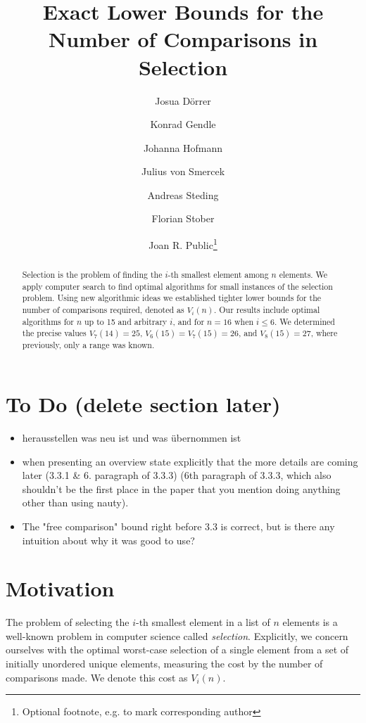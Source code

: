 \documentclass[a4paper,UKenglish,cleveref, autoref, thm-restate]{lipics-v2021}
\title{\Large Exact Lower Bounds for the Number of Comparisons in Selection}
\author{Josua Dörrer}{University Stuttgart}{}{}{}
\author{Konrad Gendle}{University Stuttgart}{}{}{}
\author{Johanna Hofmann}{University Stuttgart}{}{}{}
\author{Julius von Smercek}{University Stuttgart}{}{}{}
\author{Andreas Steding}{University Stuttgart}{}{}{}
\author{Florian Stober}{University Stuttgart}{}{}{}
\author{Joan R. Public\footnote{Optional footnote, e.g. to mark corresponding author}}{Department of Informatics, Dummy College, [optional: Address], Country}{joanrpublic@dummycollege.org}{[orcid]}{[funding]}
\begin{document}
\maketitle

\begin{abstract} \small\baselineskip=9pt
  Selection is the problem of finding the $i$-th smallest element among $n$ elements.
  We apply computer search to find optimal algorithms for small instances of the selection problem.
  Using new algorithmic ideas we established tighter lower bounds for the number of comparisons required, denoted as $V_i(n)$.
  Our results include optimal algorithms for $n$ up to 15 and arbitrary $i$, and for $n=16$ when $i \leq 6$.
  We determined the precise values $V_7(14) = 25$, $V_6(15) = V_7(15) = 26$, and $V_8(15) = 27$, where previously, only a range was known.

\end{abstract} %

\section*{To Do (delete section later)}
\begin{itemize}
  \item herausstellen was neu ist und was übernommen ist
  \item when presenting an overview state explicitly that the more details are coming later (3.3.1 \& 6. paragraph of 3.3.3) (6th paragraph of 3.3.3, which also shouldn't be the first place in the paper that you
  mention doing anything other than using nauty).
  \item The "free comparison" bound right before 3.3 is correct, but is there
  any intuition about why it was good to use?
\end{itemize}

\section{Motivation} \label{sec:motivation}

The problem of selecting the $i$-th smallest element in a list of $n$ elements is a well-known problem in computer science called \textit{selection}.
Explicitly, we concern ourselves with the optimal worst-case selection of a single element from a set of initially unordered unique elements, measuring the cost by the number of comparisons made.
We denote this cost as $V_i(n)$.
\end{document}
